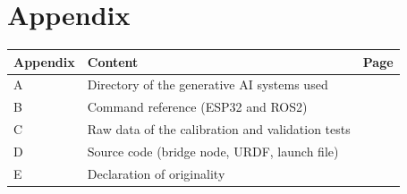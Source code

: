 \cleardoublepage
{}
\chapter*{Appendix}
{}
\thispagestyle{fancy}

\begin{tabularx}{\textwidth}{@{}l X r@{}}
  \toprule
  \textbf{Appendix} & \textbf{Content} & \textbf{Page} \\
  \midrule
  A & Directory of the generative AI systems used & \pageref{app:ai} \\
  B & Command reference (ESP32 and ROS2) & \pageref{app:commands} \\
  C & Raw data of the calibration and validation tests & \pageref{app:rawdata} \\
  D & Source code (bridge node, URDF, launch file) & \pageref{app:code} \\
  E & Declaration of originality & \pageref{app:declaration} \\
  \bottomrule
\end{tabularx}

